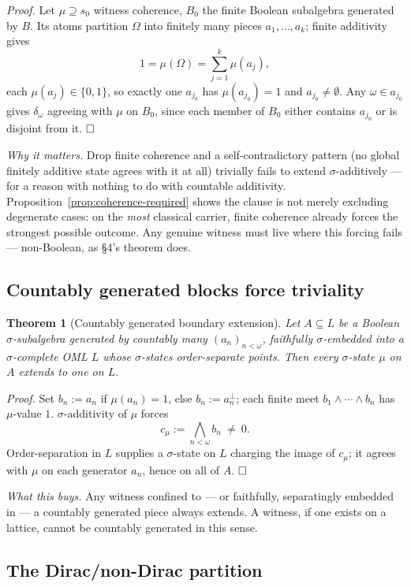 \documentclass[11pt]{article}
\newtheorem{theorem}{Theorem}[section]
\theoremstyle{remark}
\begin{document}
\emph{Proof.} Let $\mu\supseteq s_0$ witness coherence, $B_0$ the finite
Boolean subalgebra generated by $B$. Its atoms partition $\Omega$ into
finitely many pieces $a_1,\dots,a_k$; finite additivity gives
\[
  1 = \mu(\Omega) = \sum_{j=1}^k \mu(a_j),
\]
each $\mu(a_j)\in\{0,1\}$, so exactly one $a_{j_0}$ has $\mu(a_{j_0})=1$ and
$a_{j_0}\neq\emptyset$. Any $\omega\in a_{j_0}$ gives $\delta_\omega$ agreeing
with $\mu$ on $B_0$, since each member of $B_0$ either contains $a_{j_0}$ or
is disjoint from it. $\hfill\square$

\emph{Why it matters.} Drop finite coherence and a self-contradictory pattern
(no global finitely additive state agrees with it at all) trivially fails to
extend $\sigma$-additively — for a reason with nothing to do with countable
additivity. Proposition~\ref{prop:coherence-required} shows the clause is not merely
excluding degenerate cases: on the \emph{most} classical carrier, finite
coherence already forces the strongest possible outcome. Any genuine witness
must live where this forcing fails — non-Boolean, as \S4's theorem does.

\subsection{Countably generated blocks force triviality}

\begin{theorem}[Countably generated boundary extension]
\label{thm:ctbly-gen}
Let $A\subseteq L$ be a Boolean $\sigma$-subalgebra generated by countably
many $(a_n)_{n<\omega}$, faithfully $\sigma$-embedded into a
$\sigma$-complete OML $L$ whose $\sigma$-states order-separate points. Then
every $\sigma$-state $\mu$ on $A$ extends to one on $L$.
\end{theorem}

\emph{Proof.} Set $b_n := a_n$ if $\mu(a_n)=1$, else $b_n:=a_n^\perp$; each
finite meet $b_1\wedge\cdots\wedge b_n$ has $\mu$-value $1$. $\sigma$-additivity
of $\mu$ forces
\[
  c_\mu := \bigwedge_{n<\omega} b_n \ \neq\ 0.
\]
Order-separation in $L$ supplies a $\sigma$-state on $L$ charging the image
of $c_\mu$; it agrees with $\mu$ on each generator $a_n$, hence on all of
$A$. $\hfill\square$

\emph{What this buys.} Any witness confined to — or faithfully,
separatingly embedded in — a countably generated piece always extends. A
witness, if one exists on a lattice, cannot be countably generated in this
sense.

\subsection{The Dirac/non-Dirac partition}
\end{document}
